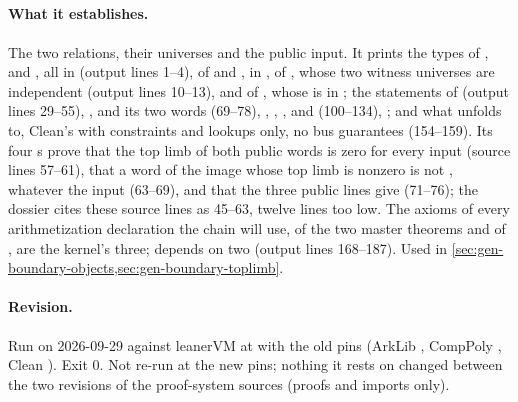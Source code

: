 \subsection{\texorpdfstring{\protect{}}{Shapes}}\label{sec:gen-boundary-probe-shapes}

\paragraph{What it establishes.} The two relations, their universes and the public input. It
prints the types of ,  and , all in
 (output lines 1--4), of  and , in , of
, whose two witness universes are independent (output lines 10--13), and of
, whose  is in ; the statements of
 (output lines 29--55), ,  and its two words
(69--78), , , ,  and
 (100--134), ; and what  unfolds to, Clean's
 with constraints and lookups only, no bus guarantees (154--159). Its four
s prove that the top limb of both public words is zero for every input (source lines
57--61), that a word of the image whose top limb is nonzero is not , whatever the
input (63--69), and that the three public lines give  (71--76); the dossier cites
these source lines as 45--63, twelve lines too low. The axioms of every arithmetization
declaration the chain will use, of the two master theorems and of ,
 are the kernel's three;  depends on two
(output lines 168--187). Used in \cref{sec:gen-boundary-objects,sec:gen-boundary-toplimb}.

\paragraph{Revision.} Run on 2026-09-29 against leanerVM  at  with the old pins (ArkLib , CompPoly , Clean ). Exit 0. Not re-run at the new pins; nothing it rests on changed between the two revisions of the proof-system sources (proofs and imports only).

